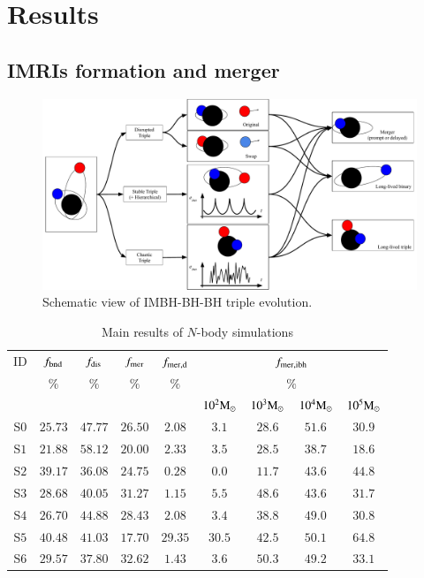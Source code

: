\documentclass[article]{aa}
\newcommand{\Ms}{{\rm M}_\odot}
\begin{document}
\section{Results}
\label{res}

\subsection{IMRIs formation and merger}
\label{sec:imris}


\begin{figure}
    \centering
    \includegraphics[width=16cm]{Sketch_IMRI}
    \caption{Schematic view of IMBH-BH-BH triple evolution.}
    \label{fig:f3}
\end{figure}

\begin{table}
\caption{Main results of $N$-body simulations}
\label{tab:mergers}
\begin{center}
\begin{tabular}{c|cccc|cccc}
\hline
\hline
ID   & $f_{\rm bnd}$ & $f_{\rm dis}$ & $f_{\rm mer}$ & $f_{\rm mer,d}$ & \multicolumn{4}{c}{$f_{\rm mer,ibh}$} \\
     & $\%$          & $\%$          & $\%$         & $\%$          & \multicolumn{4}{c}{$\%$}\\
     &               &               &              &               &$10^2\Ms$&$10^3\Ms$&$10^4\Ms$&$10^5\Ms$\\
\hline
S$0$ & $25.73$ & $47.77$ & $26.50$ & $2.08$ & $3.1 $ & $28.6 $ & $51.6 $ & $30.9 $ \\ 
S$1$ & $21.88$ & $58.12$ & $20.00$ & $2.33$ & $3.5 $ & $28.5 $ & $38.7 $ & $18.6 $ \\ 
S$2$ & $39.17$ & $36.08$ & $24.75$ & $0.28$ & $0.0 $ & $11.7 $ & $43.6 $ & $44.8 $ \\ 
S$3$ & $28.68$ & $40.05$ & $31.27$ & $1.15$ & $5.5 $ & $48.6 $ & $43.6 $ & $31.7 $ \\ 
S$4$ & $26.70$ & $44.88$ & $28.43$ & $2.08$ & $3.4 $ & $38.8 $ & $49.0 $ & $30.8 $ \\ 
S$5$ & $40.48$ & $41.03$ & $17.70$ & $29.35$& $30.5 $ & $42.5 $ & $50.1 $ & $64.8 $ \\ 
S$6$ & $29.57$ & $37.80$ & $32.62$ & $1.43$ & $3.6 $ & $50.3 $ & $49.2 $ & $33.1 $ \\ 
\hline
\end{tabular}
\label{tab:t2}
\end{center}
\end{table}
\end{document}
